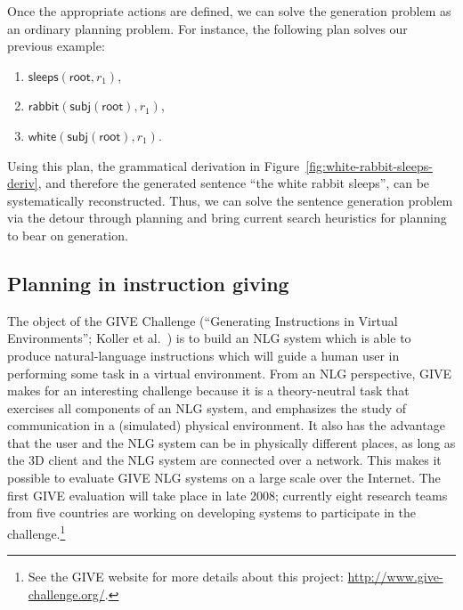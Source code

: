 Once the appropriate actions are defined, we can solve the generation
problem as an ordinary planning problem. For instance, the following plan
solves our previous example:
%
\begin{enumerate}
\item $\mathsf{sleeps}(\mathsf{root}, r_1)$,
\item $\mathsf{rabbit}(\mathsf{subj}(\mathsf{root}), r_1)$,
\item $\mathsf{white}(\mathsf{subj}(\mathsf{root}), r_1)$.
\end{enumerate}
%
Using this plan, the grammatical derivation in
Figure~\ref{fig:white-rabbit-sleeps-deriv}, and therefore the
generated sentence ``the white rabbit sleeps'', can be systematically
reconstructed. Thus, we can solve the sentence generation problem via
the detour through planning and bring current search heuristics for
planning to bear on generation.



\subsection{Planning in instruction giving}

The object of the GIVE Challenge (``Generating Instructions in Virtual
Environments''; Koller et al.\
\citeyear{alexander07:_shared_task_propos}) is to build an NLG system
which is able to produce natural-language instructions which will
guide a human user in performing some task in a virtual
environment. From an NLG perspective, GIVE makes for an interesting
challenge because it is a theory-neutral task that exercises all
components of an NLG system, and emphasizes the study of communication
in a (simulated) physical environment. It also has the advantage that
the user and the NLG system can be in physically different places, as
long as the 3D client and the NLG system are connected over a
network. This makes it possible to evaluate GIVE NLG systems on a
large scale over the Internet. The first GIVE evaluation will take
place in late 2008; currently eight research teams from five countries
are working on developing systems to participate in the
challenge.\footnote{See the GIVE website for more details about this
  project: \url{http://www.give-challenge.org/}.}

